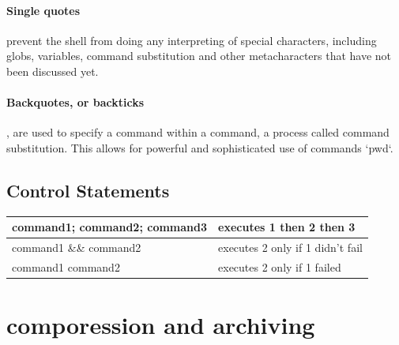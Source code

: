 \documentclass[10pt]{article}
\begin{document}
\paragraph{Single quotes} prevent the shell from doing any interpreting of special characters, including globs, variables, command
substitution and other metacharacters that have not been discussed yet.

\paragraph{Backquotes, or backticks}, are used to specify a command within a command, a process called command substitution.
This allows for powerful and sophisticated use of commands `pwd`.
\subsection{Control Statements}
\begin{tabular}{|l|l|}
	\hline
	command1; command2; command3  & executes 1 then 2 then 3 \\
	\hline
	command1 \&\& command2 & executes 2 only if 1 didn't fail \\
	\hline
	command1 \textbar	\textbar   command2 & executes 2 only if 1 failed \\
	\hline
\end{tabular}

\section{comporession and archiving}
\end{document}
